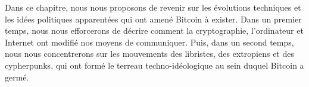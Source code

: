 Dans ce chapitre, nous nous proposons de revenir sur les évolutions techniques et les idées politiques apparentées qui ont amené Bitcoin à exister. Dans un premier temps, nous nous efforcerons de décrire comment la cryptographie, l'ordinateur et Internet ont modifié nos moyens de communiquer. Puis, dans un second temps, nous nous concentrerons sur les mouvements des libristes, des extropiens et des cypherpunks, qui ont formé le terreau techno-idéologique au sein duquel Bitcoin a germé.

%
%
%
%

